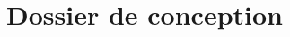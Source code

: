 



\usepackage{lastpage}
\newcommand{\xml}{\tsc{XML}}
\newcommand{\dtd}{\tsc{DTD}}
\newcommand{\classDef}[1]{\subsection{\kw{#1}}}

\title{Dossier de conception}


\maketitle
\tableofcontents
\listofalgorithms

\newpage


\newpage


%

